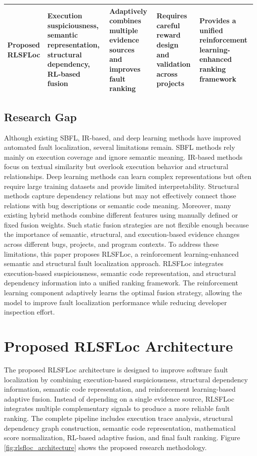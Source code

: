 \documentclass[article,article,submit,pdftex,moreauthors]{Definitions/mdpi}
\begin{document}
\begin{table}[H]
{\begin{tabular}{p{3.2cm} p{3.4cm} p{3.4cm} p{4.2cm} p{3.8cm}}
\textbf{Proposed RLSFLoc} 
& Execution suspiciousness, semantic representation, structural dependency, RL-based fusion 
& Adaptively combines multiple evidence sources and improves fault ranking 
& Requires careful reward design and validation across projects 
& Provides a unified reinforcement learning-enhanced ranking framework \\
\hline
\end{tabular}
}
\end{table}

\subsection{Research Gap}

Although existing SBFL, IR-based, and deep learning methods have improved automated fault localization, several limitations remain. SBFL methods rely mainly on execution coverage and ignore semantic meaning. IR-based methods focus on textual similarity but overlook execution behavior and structural relationships. Deep learning methods can learn complex representations but often require large training datasets and provide limited interpretability. Structural methods capture dependency relations but may not effectively connect those relations with bug descriptions or semantic code meaning. Moreover, many existing hybrid methods combine different features using manually defined or fixed fusion weights. Such static fusion strategies are not flexible enough because the importance of semantic, structural, and execution-based evidence changes across different bugs, projects, and program contexts. To address these limitations, this paper proposes RLSFLoc, a reinforcement learning-enhanced semantic and structural fault localization approach. RLSFLoc integrates execution-based suspiciousness, semantic code representation, and structural dependency information into a unified ranking framework. The reinforcement learning component adaptively learns the optimal fusion strategy, allowing the model to improve fault localization performance while reducing developer inspection effort.


\section{Proposed RLSFLoc Architecture}
\label{sec:methodology}

The proposed RLSFLoc architecture is designed to improve software fault localization by combining execution-based suspiciousness, structural dependency information, semantic code representation, and reinforcement learning-based adaptive fusion. Instead of depending on a single evidence source, RLSFLoc integrates multiple complementary signals to produce a more reliable fault ranking. The complete pipeline includes execution trace analysis, structural dependency graph construction, semantic code representation, mathematical score normalization, RL-based adaptive fusion, and final fault ranking. Figure \ref{fig:rlsfloc_architecture} shows the proposed research methodology.
\end{document}
